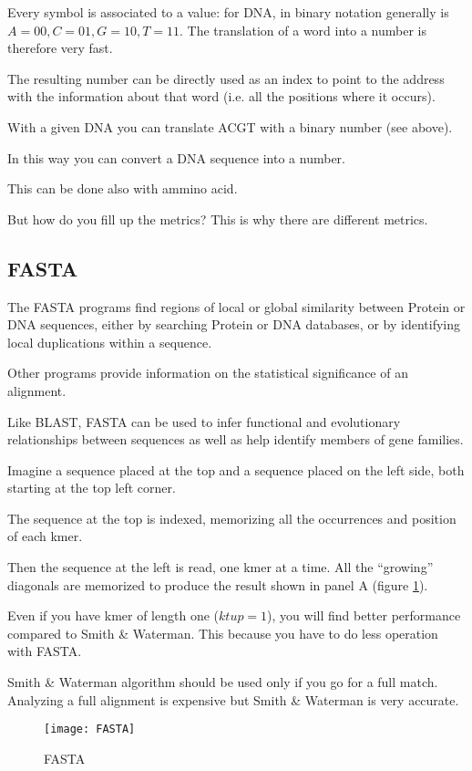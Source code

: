 Every symbol is associated to a value: for DNA, in binary notation
generally is $A=00, C=01, G=10, T=11$. The translation of a word into a
number is therefore very fast.

The resulting number can be directly used as an index to point
to the address with the information about that word (i.e. all the positions
where it occurs).

With a given DNA you can translate ACGT with a binary number (see above).

In this way you can convert a DNA sequence into a number. 

This can be done also with ammino acid.

But how do you fill up the metrics? This is why there are different metrics.

\subsection{FASTA}

The FASTA programs find regions of local or global similarity between
Protein or DNA sequences, either by searching Protein or DNA databases, or by
identifying local duplications within a sequence. 

Other programs provide information on the statistical significance of an
alignment. 

Like BLAST, FASTA can be used to infer functional and evolutionary relationships 
between sequences as well as help identify members of gene families.

Imagine a sequence placed at the top and a sequence placed on the left side,
both starting at the top left corner.

The sequence at the top is indexed, memorizing all the occurrences and
position of each kmer. 

Then the sequence at the left is read, one kmer at a time.
All the ``growing'' diagonals are memorized to produce the result shown
in panel A (figure \ref{fig:fasta}).

Even if you have kmer of length one ($ktup = 1$), you will find better
performance compared to Smith \& Waterman. This because you have to do less
operation with FASTA.

Smith \& Waterman algorithm should be used only if you go for a full match.
Analyzing a full alignment is expensive but Smith \& Waterman 
is very accurate.

\begin{figure}[H]
  \centering
  \texttt{[image: FASTA]}
  \caption{FASTA}
  \label{fig:fasta}
\end{figure}

